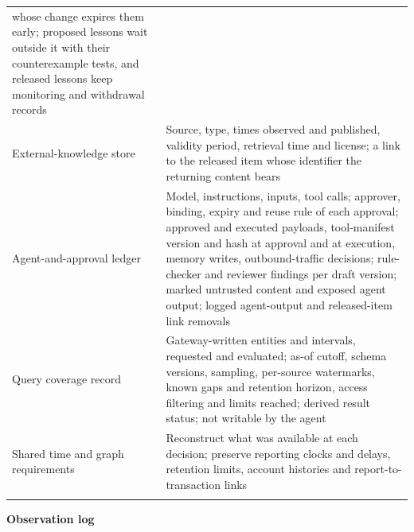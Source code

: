 \documentclass[
  11pt,
]{article}
\begin{document}
\begin{table}[tp]
{\begin{tabular}{@{}
  >{\raggedright\arraybackslash}p{}
  >{\raggedright\arraybackslash}p{}@{}}
whose change expires them early; proposed lessons wait outside it with
their counterexample tests, and released lessons keep monitoring and
withdrawal records \\
External-knowledge store & Source, type, times observed and published,
validity period, retrieval time and license; a link to the released item
whose identifier the returning content bears \\
Agent-and-approval ledger & Model, instructions, inputs, tool calls;
approver, binding, expiry and reuse rule of each approval; approved and
executed payloads, tool-manifest version and hash at approval and at
execution, memory writes, outbound-traffic decisions; rule-checker and
reviewer findings per draft version; marked untrusted content and
exposed agent output; logged agent-output and released-item link
removals \\
Query coverage record & Gateway-written entities and intervals,
requested and evaluated; as-of cutoff, schema versions, sampling,
per-source watermarks, known gaps and retention horizon, access
filtering and limits reached; derived result status; not writable by the
agent \\
Shared time and graph requirements & Reconstruct what was available at
each decision; preserve reporting clocks and delays, retention limits,
account histories and report-to-transaction links \\

\bottomrule\noalign{}
\end{tabular}
}
\end{table}


\textbf{Observation log}
\end{document}
